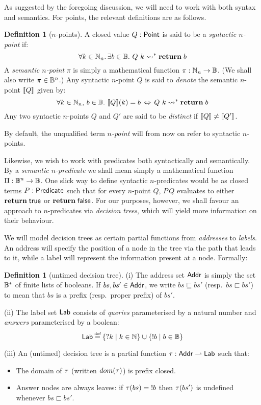 \documentclass[12pt,phd,lfcs,twoside,openright,logo,leftchapter,normalheadings]{infthesis}
\theoremstyle{plain}
\theoremstyle{definition}
\newtheorem{definition}[theorem]{Definition}
\begin{document}
As suggested by the foregoing discussion, we will need to work with
both syntax and semantics.  For points, the relevant definitions are
as follows.

\begin{definition}[$n$-points]\label{def:semantic-n-point}
  A closed value $Q : \mathsf{Point}$ is said to be a \emph{syntactic $n$-point} if:
{\small
  \[
    \forall k \in \mathbb{N}_n.\,\exists b \in \mathbb{B}.~ Q~k \leadsto^\ast \mathbf{return}\;b
  \]}%
A \emph{semantic $n$-point} $\pi$ is simply a mathematical function
$\pi: \mathbb{N}_n \to \mathbb{B}$.  (We shall also write $\pi \in \mathbb{B}^n$.)  Any
syntactic $n$-point $Q$ is said to \emph{denote} the semantic
$n$-point $\val{Q}$ given by:
{\small
  \[
  \forall k \in \mathbb{N}_n,\, b \in \mathbb{B}.~ \llbracket Q \rrbracket (k) = b \,\Leftrightarrow\, Q~k \leadsto^\ast \mathbf{return}\;b
  \]}%
%
Any two syntactic $n$-points $Q$ and $Q'$ are said to be
\emph{distinct} if $\val{Q} \neq \val{Q'}$.
%
\end{definition}

By default, the unqualified term \emph{$n$-point} will from now on
refer to syntactic $n$-points.

Likewise, we wish to work with predicates both syntactically and
semantically.  By a \emph{semantic $n$-predicate} we shall mean simply
a mathematical function $\Pi: \mathbb{B}^n \to \mathbb{B}$.  One slick way to define
syntactic $n$-predicates would be as closed terms $P:\mathsf{Predicate}$ such
that for every $n$-point $Q$, $P\,Q$ evaluates to either
$\mathbf{return}\;\mathsf{true}$ or $\mathbf{return}\;\mathsf{false}$.  For our purposes, however, we
shall favour an approach to $n$-predicates via \emph{decision trees},
which will yield more information on their behaviour.

We will model decision trees as certain partial functions from
\emph{addresses} to \emph{labels}.  An address will specify the
position of a node in the tree via the path that leads to it, while a
label will represent the information present at a node. Formally:

\begin{definition}[untimed decision tree]\label{def:decision-tree}
  (i) The address set $\mathsf{Addr}$ is simply the set $\mathbb{B}^\ast$ of finite lists of booleans.
      If $bs,bs' \in \mathsf{Addr}$, we write $bs \sqsubseteq bs'$ (resp.\ $bs \sqsubset bs'$)
      to mean that $bs$ is a prefix (resp.\ proper prefix) of $bs'$.

  (ii) The label set $\mathsf{Lab}$ consists of \emph{queries} parameterised by a natural
       number and \emph{answers} parameterised by a boolean:
{\small
  \[
  \Lab \defas \{\query k \mid k \in \N \} \cup \{\ans b \mid b \in \B \}
  \]
}%

 (iii) An (untimed) decision tree is a partial function $\tau : \mathsf{Addr}
\rightharpoonup \mathsf{Lab}$ such that:
\begin{itemize}
  \item The domain of $\tau$ (written $dom(\tau)$) is prefix closed.
  \item Answer nodes are always leaves:
    if $\tau(bs) = \mathord{!} b$ then $\tau(bs')$ is undefined whenever $bs \sqsubset bs'$.
\end{itemize}
\end{definition}
\end{document}
